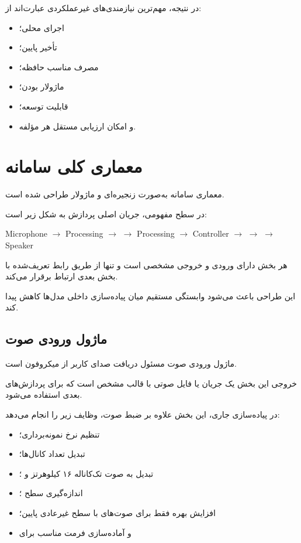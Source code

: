 در نتیجه، مهم‌ترین نیازمندی‌های غیرعملکردی عبارت‌اند از:

\begin{itemize}

    \item اجرای محلی؛
    \item تأخیر پایین؛
    \item مصرف مناسب حافظه؛
    \item ماژولار بودن؛
    \item قابلیت توسعه؛
    \item و امکان ارزیابی مستقل هر مؤلفه.
\end{itemize}


\section{معماری کلی سامانه}

معماری سامانه به‌صورت زنجیره‌ای و ماژولار طراحی شده است.

در سطح مفهومی، جریان اصلی پردازش به شکل زیر است:

\begin{center}
Microphone
$\longrightarrow$
 Processing
$\longrightarrow$
$\longrightarrow$
 Processing
$\longrightarrow$
 Controller
$\longrightarrow$
$\longrightarrow$
$\longrightarrow$
Speaker
\end{center}

هر بخش دارای ورودی و خروجی مشخصی است و تنها از طریق رابط
تعریف‌شده با بخش بعدی ارتباط برقرار می‌کند.

این طراحی باعث می‌شود وابستگی مستقیم میان پیاده‌سازی داخلی
مدل‌ها کاهش پیدا کند.


\subsection{ماژول ورودی صوت}

ماژول ورودی صوت مسئول دریافت صدای کاربر از میکروفون است.

خروجی این بخش یک جریان یا فایل صوتی با قالب مشخص است که
برای پردازش‌های بعدی استفاده می‌شود.

در پیاده‌سازی جاری، این بخش علاوه بر ضبط صوت، وظایف زیر را
انجام می‌دهد:

\begin{itemize}

    \item تنظیم نرخ نمونه‌برداری؛
    \item تبدیل تعداد کانال‌ها؛
    \item تبدیل به صوت تک‌کاناله ۱۶ کیلوهرتز و ؛
    \item اندازه‌گیری سطح ؛
    \item افزایش بهره فقط برای صوت‌های با سطح غیرعادی پایین؛
    \item و آماده‌سازی فرمت مناسب برای 
\end{itemize}


